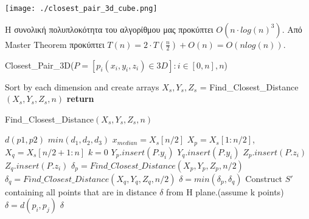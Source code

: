 \documentclass{article} \usepackage[greek,english]{babel}
\begin{document}
    \begin{center}
        \texttt{[image: ./closest\_pair\_3d\_cube.png]}

    \end{center}

    Η συνολική πολυπλοκότητα του αλγορίθμου μας προκύπτει $O(n \cdot log(n)^3)$. Από Master Theorem 
    προκύπτει $T(n) = 2\cdot T(\frac{n}{2}) + O(n) = O(nlog(n))$.
    \begin{algorithm}
        \caption{Closest\_Pair\_3D($P= [ p_i(x_i,y_i,z_i)\in 3D]:i \in[0,n], n$)}
        \begin{algorithmic}[1]
            \State Sort by each dimension and create arrays $X_s, Y_s, Z_s$ 
            \State \delta = Find\_Closest\_Distance$(X_s, Y_s, Z_s, n)$
            \State \textbf{return} \delta

        \end{algorithmic}
    \end{algorithm}

    \begin{algorithm}
        \caption{Find\_Closest\_Distance$(X_s, Y_s, Z_s, n)$}
        \begin{algorithmic}[1]
                \Return $d(p1,p2)$
            \EndIf
                \Return $min(d_1, d_2, d_3)$
            \Else
                \State $x_{median} = X_s[n/2]$
                \State $X_p = X_s[1:n/2]$, $X_q = X_s[n/2+1:n]$
                \State $k = 0$
                        \State $Y_p.insert(P.y_i)$
                    \Else
                        \State $Y_q.insert(P.y_{i})$
                    \EndIf
                        \State $Z_p.insert(P.z_i)$
                    \Else
                        \State $Z_q.insert(P.z_{i})$
                    \EndIf
                \EndFor
                \State $\delta_p = Find\_Closest\_Distance(X_p, Y_p, Z_p, n/2)$
                \State $\delta_q = Find\_Closest\_Distance(X_q, Y_q, Z_q, n/2)$
                \State $\delta = min(\delta_p, \delta_q)$ 
                \State Construct $S'$ containing all points that are in distance $\delta$ from H plane.(assume k points) 
                            $\delta = d(p_i,p_j)$ 
                            \EndIf
                        \EndIf
                    \EndFor
                \EndFor
                \Return $\delta$

            \EndIf

        \end{algorithmic}
    \end{algorithm}
\pagebreak
\end{document}
